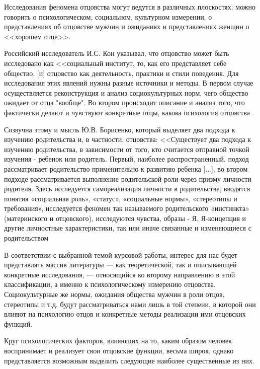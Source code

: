 \documentclass{../../common/thesisbyxetex}
\begin{document}
Исследования феномена отцовства могут ведутся  в различных плоскостях: можно говорить о 
психологическом, социальном, культурном измерении, о представлениях об отцовстве мужчин и ожиданиях 
и представлениях женщин о <<хорошем отце>>.

Российский исследователь И.С. Кон указывал, что отцовство может быть исследовано как <<социальный 
институт, то, как его представляет себе общество, [и] отцовство как деятельность, практики и 
стили поведения. Для исследования этих явлений нужны разные источники и методы. В первом случае 
осуществляется реконструкция и анализ социокультурных норм, чего общество ожидает от отца "вообще". 
Во втором происходит описание и анализ того, что фактически делают и чувствуют конкретные отцы, 
какова психология отцовства \cite[3]{konot}.

Созвучна этому и мысль Ю.В. Борисенко, который выделяет два подхода к изучению родительства и, в 
частности, отцовства: <<Существует два подхода к изучению родительства, в зависимости от того, кто 
считается отправной точкой изучения - ребенок или родитель. Первый, наиболее распространенный, 
подход рассматривает родительство применительно к развитию ребенка [...], во втором подходе 
рассматривается выполнение родительской роли через призму личности родителя. Здесь исследуется 
самореализация личности в родительстве, вводятся понятия «социальная роль», «статус», «социальные 
нормы», «стереотипы и требования», исследуется феномен так называемого родительского «инстинкта»
(материнского и отцовского), исследуются чувства, образы - Я, Я-концепция и другие личностные 
характеристики, так или иначе связанные и изменяющиеся с родительством \cite[11]{psyot}

В соответствии с выбранной темой курсовой работы, интерес для нас будет представлять массив 
литературы --- как теоретической, так и описывающей конкретные исследования, --- относящийся ко 
второму направлению в этой классификации, а именно к психологическому измерению отцовства. 
Социокультурные же нормы, ожидания общества мужчин в роли отцов, стереотипы и т.д. будут 
рассматриваться нами лишь в той степени, в которой они влияют на психологию отцов и конкретные 
методы реализации ими отцовских функций.



Круг психологических факторов, влияющих на то, каким 
образом человек воспринимает и реализует свои отцовские функции, весьма широк, однако 
представляется 
возможным выделить следующие наиболее существенные из них.
\end{document}
